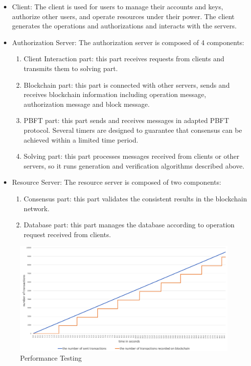 \begin{itemize}
  \item Client: The client is used for users to manage their accounts and keys, authorize other users, and operate resources under their power. The client generates the operations and authorizations and interacts with the servers.
  \item Authorization Server: The authorization server is composed of 4 components:
    \begin{enumerate}
      \item Client Interaction part: this part receives requests from clients and transmits them to solving part.
      \item Blockchain part: this part is connected with other servers, sends and receives blockchain information including operation message, authorization message and block message.
      \item PBFT part: this part sends and receives messages in adapted PBFT protocol. Several timers are designed to guarantee that consensus can be achieved within a limited time period.
      \item Solving part: this part processes messages received from clients or other servers, so it runs generation and verification algorithms described above.
    \end{enumerate}
  \item Resource Server: The resource server is composed of two components:
    \begin{enumerate}
      \item Consensus part: this part validates the consistent results in the blockchain network.
      \item Database part: this part manages the database according to operation request received from clients.
    \end{enumerate}
\end{itemize}

\begin{figure}
\centering
\includegraphics[width=12cm, keepaspectratio]{figures/performance.png}
\caption{Performance Testing}
\label{fig:performance}
\end{figure}

